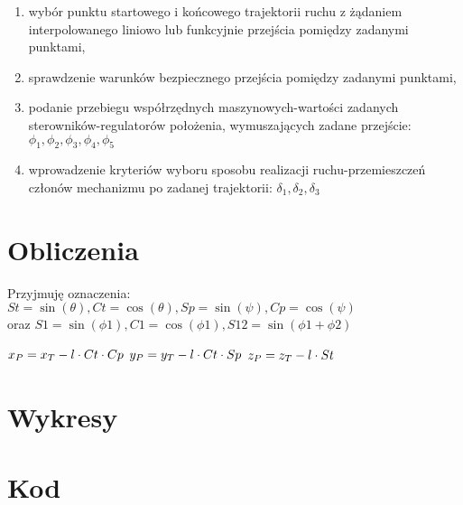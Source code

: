 \documentclass[a4paper]{article}
\begin{document}
\begin{enumerate}
\begin{enumerate}
		\end{enumerate}
		\item wybór punktu startowego i końcowego trajektorii ruchu z żądaniem interpolowanego liniowo lub funkcyjnie przejścia pomiędzy zadanymi punktami,
		\item sprawdzenie warunków bezpiecznego przejścia pomiędzy zadanymi punktami,
		\item podanie przebiegu współrzędnych maszynowych-wartości zadanych sterowników-regulatorów położenia, wymuszających zadane przejście: $\phi_1, \phi_2, \phi_3, \phi_4, \phi_5$
		\item wprowadzenie kryteriów wyboru sposobu realizacji ruchu-przemieszczeń członów mechanizmu po zadanej trajektorii: $\delta_1, \delta_2, \delta_3$
	\end{enumerate}
	\section{Obliczenia}
	Przyjmuję oznaczenia: $St=\sin(\theta), Ct=\cos(\theta), Sp=\sin(\psi), Cp=\cos(\psi)$ \\
	 oraz $S1=\sin(\phi1), C1=\cos(\phi1), S12=\sin(\phi1+\phi2)$
	
	
	$x_P=x_T-l\cdot Ct\cdot Cp$
	$y_P=y_T-l\cdot Ct\cdot Sp$
	$z_P=z_T-l\cdot St$
	
	
	\section{Wykresy}
	
	\section{Kod}
\end{document}
